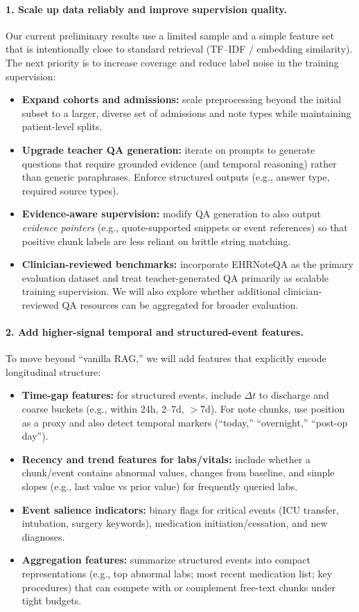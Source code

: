 \label{sec:nextsteps}
\paragraph{1. Scale up data reliably and improve supervision quality.}
Our current preliminary results use a limited sample and a simple feature set that is intentionally close to standard retrieval (TF--IDF / embedding similarity). The next priority is to increase coverage and reduce label noise in the training supervision:
\begin{itemize}
    \item \textbf{Expand cohorts and admissions:} scale preprocessing beyond the initial subset to a larger, diverse set of admissions and note types while maintaining patient-level splits.
    \item \textbf{Upgrade teacher QA generation:} iterate on prompts to generate questions that require grounded evidence (and temporal reasoning) rather than generic paraphrases. Enforce structured outputs (e.g., answer type, required source types).
    \item \textbf{Evidence-aware supervision:} modify QA generation to also output \emph{evidence pointers} (e.g., quote-supported snippets or event references) so that positive chunk labels are less reliant on brittle string matching.
    \item \textbf{Clinician-reviewed benchmarks:} incorporate EHRNoteQA as the primary evaluation dataset and treat teacher-generated QA primarily as scalable training supervision. We will also explore whether additional clinician-reviewed QA resources can be aggregated for broader evaluation.
\end{itemize}

\paragraph{2. Add higher-signal temporal and structured-event features.}
To move beyond ``vanilla RAG,'' we will add features that explicitly encode longitudinal structure:
\begin{itemize}
    \item \textbf{Time-gap features:} for structured events, include $\Delta t$ to discharge and coarse buckets (e.g., within 24h, 2--7d, $>$7d). For note chunks, use position as a proxy and also detect temporal markers (``today,'' ``overnight,'' ``post-op day'').
    \item \textbf{Recency and trend features for labs/vitals:} include whether a chunk/event contains abnormal values, changes from baseline, and simple slopes (e.g., last value vs prior value) for frequently queried labs.
    \item \textbf{Event salience indicators:} binary flags for critical events (ICU transfer, intubation, surgery keywords), medication initiation/cessation, and new diagnoses.
    \item \textbf{Aggregation features:} summarize structured events into compact representations (e.g., top abnormal labs; most recent medication list; key procedures) that can compete with or complement free-text chunks under tight budgets.
\end{itemize}

